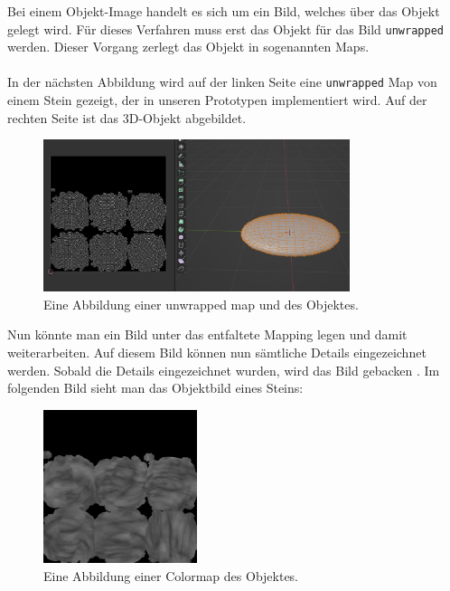 Bei einem Objekt-Image handelt es sich um ein Bild, welches über das Objekt gelegt wird. Für dieses Verfahren muss erst das Objekt für das Bild \verb+unwrapped+ werden. Dieser Vorgang zerlegt das Objekt in sogenannten Maps.\\\\
In der nächsten Abbildung wird auf der linken Seite eine \verb+unwrapped+ Map von einem Stein gezeigt, der in unseren Prototypen implementiert wird. Auf der rechten Seite ist das 3D-Objekt abgebildet.


\begin{figure}[H]
    \centering
    \includegraphics[width=0.8\textwidth]{chapters/11/Images/StoneAndUnwrap.png}
    \caption{Eine Abbildung einer unwrapped map und des Objektes.}
    \label{htl01}
\end{figure}

\noindent Nun könnte man ein Bild unter das entfaltete Mapping legen und damit weiterarbeiten. Auf diesem Bild können nun sämtliche Details eingezeichnet werden. Sobald die Details eingezeichnet wurden, wird das Bild \glqq gebacken \grqq. Im folgenden Bild sieht man das Objektbild eines Steins: %

\begin{figure}[H]
    \centering
    \includegraphics[width=0.4\textwidth]{chapters/11/Images/SteinColor.png}
    \caption{Eine Abbildung einer Colormap des Objektes.}
    \label{htl01}
\end{figure}

